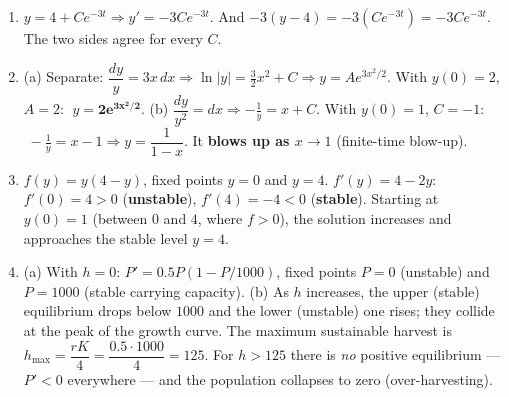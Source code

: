 \documentclass[11pt]{article}
\begin{document}
\begin{enumerate}[leftmargin=2em, itemsep=0.6em, start=26]
\item $y = 4 + Ce^{-3t} \Rightarrow y' = -3Ce^{-3t}$. \;And $-3(y-4) = -3(Ce^{-3t}) = -3Ce^{-3t}$. The two sides agree for every $C$. \checkmark

\item (a) Separate: $\dfrac{dy}{y} = 3x\,dx \Rightarrow \ln|y| = \tfrac32 x^2 + C \Rightarrow y = A e^{3x^2/2}$. With $y(0)=2$, $A=2$: $\;y = \mathbf{2e^{3x^2/2}}$. \;(b) $\dfrac{dy}{y^2}=dx \Rightarrow -\tfrac1y = x + C$. With $y(0)=1$, $C=-1$: $\;-\tfrac1y = x-1 \Rightarrow y = \dfrac{1}{1-x}$. It \textbf{blows up as $x\to 1$} (finite-time blow-up).

\item $f(y)=y(4-y)$, fixed points $y=0$ and $y=4$. $f'(y)=4-2y$: $f'(0)=4>0$ (\textbf{unstable}), $f'(4)=-4<0$ (\textbf{stable}). Starting at $y(0)=1$ (between $0$ and $4$, where $f>0$), the solution increases and approaches the stable level $y=4$.

\item (a) With $h=0$: $P'=0.5P(1-P/1000)$, fixed points $P=0$ (unstable) and $P=1000$ (stable carrying capacity). \;(b) As $h$ increases, the upper (stable) equilibrium drops below $1000$ and the lower (unstable) one rises; they collide at the peak of the growth curve. The maximum sustainable harvest is $h_{\max} = \dfrac{rK}{4} = \dfrac{0.5\cdot 1000}{4} = 125$. For $h>125$ there is \emph{no} positive equilibrium --- $P'<0$ everywhere --- and the population collapses to zero (over-harvesting).
\end{enumerate}
\end{document}
